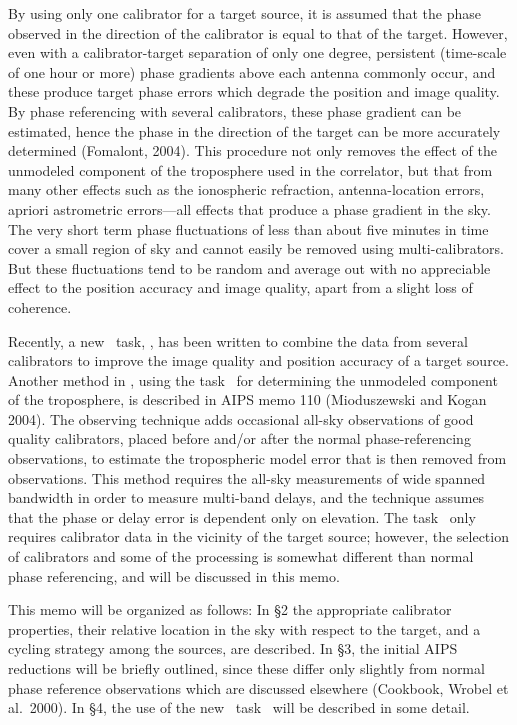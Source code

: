     By using only one calibrator for a target source, it is assumed
that the phase observed in the direction of the calibrator is equal to
that of the target.  However, even with a calibrator-target separation
of only one degree, persistent (time-scale of one hour or more) phase
gradients above each antenna commonly occur, and these produce target
phase errors which degrade the position and image quality.  By phase
referencing with several calibrators, these phase gradient can be
estimated, hence the phase in the direction of the target can be more
accurately determined (Fomalont, 2004).  This procedure not only
removes the effect of the unmodeled component of the troposphere used
in the correlator, but that from many other effects such as the
ionospheric refraction, antenna-location errors, apriori astrometric
errors---all effects that produce a phase gradient in the sky.  The
very short term phase fluctuations of less than about five minutes in
time cover a small region of sky and cannot easily be removed using
multi-calibrators.  But these fluctuations tend to be random and
average out with no appreciable effect to the position accuracy and
image quality, apart from a slight loss of coherence.

     Recently, a new \AIPS~task, \ATMCA, has been written to combine
the data from several calibrators to improve the image quality and
position accuracy of a target source.  Another method in \AIPS, using
the task \DELZN~for determining the unmodeled component of the
troposphere, is described in AIPS memo 110 (Mioduszewski and Kogan
2004).  The observing technique adds occasional all-sky observations
of good quality calibrators, placed before and/or after the normal
phase-referencing observations, to estimate the tropospheric model
error that is then removed from observations.  This method requires
the all-sky measurements of wide spanned bandwidth in order to measure
multi-band delays, and the technique assumes that the phase or delay
error is dependent only on elevation.  The task \ATMCA~only requires
calibrator data in the vicinity of the target source; however, the
selection of calibrators and some of the processing is somewhat
different than normal phase referencing, and will be discussed in this
memo.

     This memo will be organized as follows: In \S 2 the appropriate
calibrator properties, their relative location in the sky with respect
to the target, and a cycling strategy among the sources, are
described.  In \S 3, the initial AIPS reductions will be briefly
outlined, since these differ only slightly from normal phase reference
observations which are discussed elsewhere (\AIPS Cookbook, Wrobel et
al.~2000).  In \S 4, the use of the new \AIPS~task \ATMCA~will be
described in some detail.

